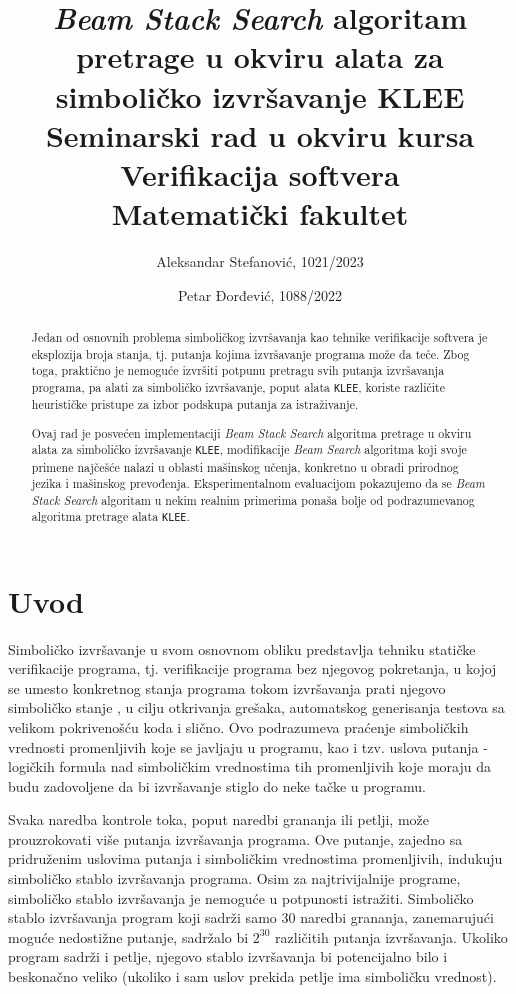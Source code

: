 \documentclass[a4paper]{article}
\title{\textit{Beam Stack Search} algoritam pretrage u okviru alata za simboličko izvršavanje KLEE\\ \small{Seminarski rad u okviru kursa\\Verifikacija softvera\\Matematički fakultet}}
\author{Aleksandar Stefanović, 1021/2023 \and Petar Đorđević, 1088/2022}
\begin{document}
\maketitle

\begin{abstract}

Jedan od osnovnih problema simboličkog izvršavanja kao tehnike verifikacije softvera je eksplozija broja stanja, tj. putanja kojima izvršavanje programa može da teče. Zbog toga, praktično je nemoguće izvršiti potpunu pretragu svih putanja izvršavanja programa, pa alati za simboličko izvršavanje, poput alata \verb|KLEE|, koriste različite heurističke pristupe za izbor podskupa putanja za istraživanje.

Ovaj rad je posvećen implementaciji \textit{Beam Stack Search} algoritma pretrage u okviru alata za simboličko izvršavanje \verb|KLEE|, modifikacije \textit{Beam Search} algoritma koji svoje primene najčešće nalazi u oblasti mašinskog učenja, konkretno u obradi prirodnog jezika i mašinskog prevođenja. Eksperimentalnom evaluacijom pokazujemo da se \textit{Beam Stack Search} algoritam u nekim realnim primerima ponaša bolje od podrazumevanog algoritma pretrage alata \verb|KLEE|.

\end{abstract}

\tableofcontents

\newpage

\section{Uvod}

Simboličko izvršavanje u svom osnovnom obliku predstavlja tehniku statičke verifikacije programa, tj. verifikacije programa bez njegovog pokretanja, u kojoj se umesto konkretnog stanja programa tokom izvršavanja prati njegovo simboličko stanje \cite{SymExec-King-10.1145/360248.360252}, u cilju otkrivanja grešaka, automatskog generisanja testova sa velikom pokrivenošću koda i slično. Ovo podrazumeva praćenje simboličkih vrednosti promenljivih koje se javljaju u programu, kao i tzv. uslova putanja - logičkih formula nad simboličkim vrednostima tih promenljivih koje moraju da budu zadovoljene da bi izvršavanje stiglo do neke tačke u programu.

Svaka naredba kontrole toka, poput naredbi grananja ili petlji, može prouzrokovati više putanja izvršavanja programa. Ove putanje, zajedno sa pridruženim uslovima putanja i simboličkim vrednostima promenljivih, indukuju simboličko stablo izvršavanja programa. Osim za najtrivijalnije programe, simboličko stablo izvršavanja je nemoguće u potpunosti istražiti. Simboličko stablo izvršavanja program koji sadrži samo $30$ naredbi grananja, zanemarujući moguće nedostižne putanje, sadržalo bi $2^{30}$ različitih putanja izvršavanja. Ukoliko program sadrži i petlje, njegovo stablo izvršavanja bi potencijalno bilo i beskonačno veliko (ukoliko i sam uslov prekida petlje ima simboličku vrednost).
\end{document}

